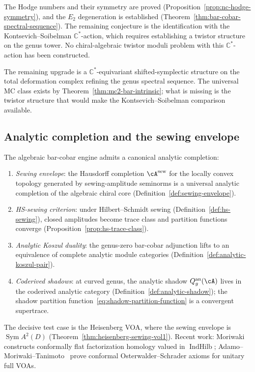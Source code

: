 \begin{remark}[Scope]\label{rem:nc-hodge-scope}
The Hodge numbers and their symmetry are proved
(Proposition~\ref{prop:nc-hodge-symmetry}), and the $E_2$
degeneration is established
(Theorem~\ref{thm:bar-cobar-spectral-sequence}). The remaining
conjecture is the identification with the Kontsevich--Soibelman
$\mathbb{C}^*$-action, which requires establishing a twistor
structure on the genus tower. No chiral-algebraic twistor moduli
problem with this $\mathbb{C}^*$-action has been constructed.

The remaining upgrade is a $\mathbb{C}^*$-equivariant
shifted-symplectic structure on the total deformation complex
refining the genus spectral sequence. The universal MC class exists by
Theorem~\ref{thm:mc2-bar-intrinsic}; what is missing is the twistor
structure that would make the Kontsevich--Soibelman comparison
available.
\end{remark}

\subsection{Analytic completion and the sewing envelope}
\label{subsec:analytic-completion-programme-editorial}

\begin{conjecture}\label{conj:analytic-completion-programme}%
The algebraic bar-cobar engine admits a canonical analytic completion:
\begin{enumerate}[label=\textup{(\roman*)}]
\item \emph{Sewing envelope}: the Hausdorff completion
 $\cA^{\mathrm{sew}}$ for the locally convex topology generated by
 sewing-amplitude seminorms is a universal analytic completion of
 the algebraic chiral core
 (Definition~\ref{def:sewing-envelope}).
\item \emph{HS-sewing criterion}: under Hilbert--Schmidt sewing
 (Definition~\ref{def:hs-sewing}), closed amplitudes become trace
 class and partition functions converge
 (Proposition~\ref{prop:hs-trace-class}).
\item \emph{Analytic Koszul duality}: the genus-zero bar-cobar
 adjunction lifts to an equivalence of complete analytic module
 categories (Definition~\ref{def:analytic-koszul-pair}).
\item \emph{Coderived shadows}: at curved genus, the analytic shadow
 $Q_g^{\mathrm{an}}(\cA)$ lives in the coderived analytic category
 (Definition~\ref{def:analytic-shadow}); the shadow partition
 function~\eqref{eq:shadow-partition-function} is a convergent
 supertrace.
\end{enumerate}
The decisive test case is the Heisenberg VOA, where the sewing
envelope is $\operatorname{Sym} A^2(D)$
\textup{(}Theorem~\textup{\ref{thm:heisenberg-sewing-vol1}}\textup{)}.
Recent work: Moriwaki~\cite{Moriwaki26a, Moriwaki26b} constructs
conformally flat factorization homology valued in
$\operatorname{IndHilb}$; Adamo--Moriwaki--Tanimoto~\cite{AMT24} prove
conformal Osterwalder--Schrader axioms for unitary full VOAs.
\end{conjecture}

